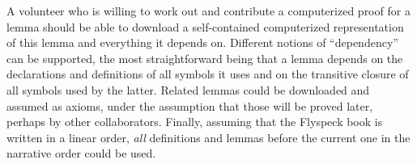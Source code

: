 A volunteer who is willing to work out and contribute a computerized proof for a
lemma should be able to download a self-contained computerized representation of
this lemma and everything it depends on.  Different notions of ``dependency''
can be supported, the most straightforward being that a lemma depends on the
declarations and definitions of all symbols it uses and on the transitive
closure of all symbols used by the latter.  Related lemmas could be downloaded
and assumed as axioms, under the assumption that those will be proved later,
perhaps by other collaborators.  Finally, assuming that the Flyspeck book is
written in a linear order, \emph{all} definitions and lemmas before the current
one in the narrative order could be used.

\newcommand{\wikipage}[6]{\node[draw,text width=4cm,font=\tiny\sffamily,#6] (#1) at #2 {
    {\scriptsize\bfseries #3}\\
    #4
    ~\\[1em]
    [Download Twelf representation]\\
    #5
  };}
\newcommand{\dummywikipage}[2]{\wikipage{#1}{#2}{\textcolor{red!20}{Cosine}}{\textcolor{red!20}{$\cos$}}{
      \textcolor{red!20}{Page type: Definition\\
      Topic: Trigonometry}
    }{fill=red!20}}
